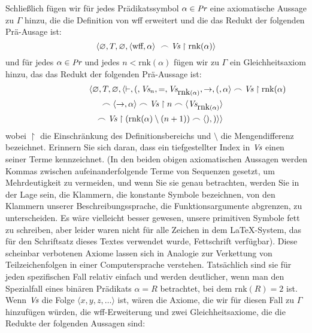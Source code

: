 Schließlich fügen wir für jedes Prädikatssymbol $\alpha\in \mbox{\em Pr}$ eine axiomatische Aussage zu $\Gamma$ hinzu, die die Definition von wff erweitert und die das Redukt der folgenden Prä-Ausage ist: 
\begin{displaymath}
    \langle\varnothing,T,\varnothing,
            \langle \mbox{wff},\alpha\rangle\
            \frown \mbox{\em Vs}\restriction\mbox{rnk}(\alpha)\rangle
\end{displaymath}
und für jedes $\alpha\in \mbox{\em Pr}$ und jedes $n < \mbox{rnk}(\alpha)$ fügen wir zu $\Gamma$ ein Gleichheitsaxiom hinzu, das das Redukt der folgenden Prä-Aussage ist:
\begin{eqnarray*}
    \lefteqn{\langle\varnothing,T,\varnothing,
            \langle
      \vdash,(,\mbox{\em Vs}_n,=,\mbox{\em Vs}_{\mbox{rnk}(\alpha)},\to,
            (,\alpha\rangle\frown \mbox{\em Vs}\restriction\mbox{rnk}(\alpha)} \\
  & & \frown
            \langle\to,\alpha\rangle\frown \mbox{\em Vs}\restriction n\frown
            \langle \mbox{\em Vs}_{\mbox{rnk}(\alpha)}\rangle \\
 & & \frown
            \mbox{\em Vs}\restriction(\mbox{rnk}(\alpha)\setminus(n+1))\frown
            \langle),)\rangle\rangle
\end{eqnarray*}
wobei $\restriction$ die Einschränkung des Definitionsbereichs und $\setminus$ die Mengendifferenz bezeichnet.  Erinnern Sie sich daran, dass ein tiefgestellter Index in $\mbox{\em Vs}$ einen seiner Terme kennzeichnet.  (In den beiden obigen axiomatischen Aussagen werden Kommas zwischen aufeinanderfolgende Terme von Sequenzen gesetzt, um Mehrdeutigkeit zu vermeiden, und wenn Sie sie genau betrachten, werden Sie in der Lage sein, die Klammern, die konstante Symbole bezeichnen, von den Klammern unserer Beschreibungssprache, die Funktionsargumente abgrenzen, zu unterscheiden.  Es wäre vielleicht besser gewesen, unsere primitiven Symbole fett zu schreiben, aber leider waren nicht für alle Zeichen in dem \LaTeX-System, das für den Schriftsatz dieses Textes verwendet wurde, Fettschrift verfügbar).  Diese scheinbar verbotenen Axiome lassen sich in Analogie zur Verkettung von Teilzeichenfolgen in einer Computersprache verstehen.  Tatsächlich sind sie für jeden spezifischen Fall relativ einfach und werden deutlicher, wenn man den Spezialfall eines binären Prädikats $\alpha = R$ betrachtet, bei dem $\mbox{rnk}(R)=2$ ist.  Wenn $\mbox{\em Vs}$ die Folge $\langle x,y,z,\ldots\rangle$ ist, wären die Axiome, die wir für diesen Fall zu $\Gamma$ hinzufügen würden, die wff-Erweiterung und zwei Gleichheitsaxiome, die die Redukte der folgenden Aussagen sind: 
